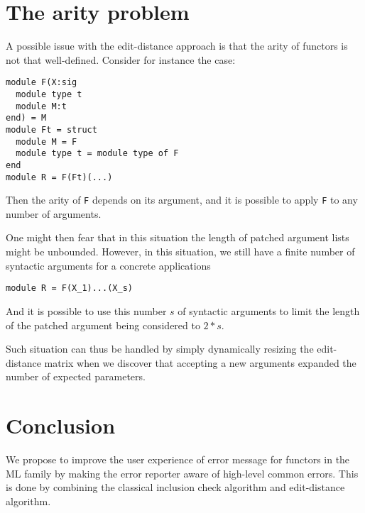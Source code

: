 \documentclass{article}
\begin{document}
\section{The arity problem \label{variadic}}

A possible issue with the edit-distance approach is that the arity of functors is not that well-defined.
Consider for instance the case:
\begin{verbatim}
module F(X:sig
  module type t
  module M:t
end) = M
module Ft = struct
  module M = F
  module type t = module type of F
end
module R = F(Ft)(...)
\end{verbatim}
Then the arity of \texttt{F} depends on its argument, and it is possible to apply \texttt{F} to
any number of arguments.

One might then fear that in this situation the length of patched argument
lists might be unbounded.
However, in this situation, we still have a finite number of syntactic arguments for a concrete applications
\begin{verbatim}
module R = F(X_1)...(X_s)
\end{verbatim}
And it is possible to use this number $s$ of syntactic arguments to limit the length of the patched
argument being considered to $2 * s$.

Such situation can thus be handled by simply dynamically resizing the edit-distance matrix when
we discover that accepting a new arguments expanded the number of expected parameters.

\section{Conclusion}

We propose to improve the user experience of error message for functors in the ML family by making
the error reporter aware of high-level common errors. This is done by combining the classical
inclusion check algorithm and edit-distance algorithm.
\end{document}
